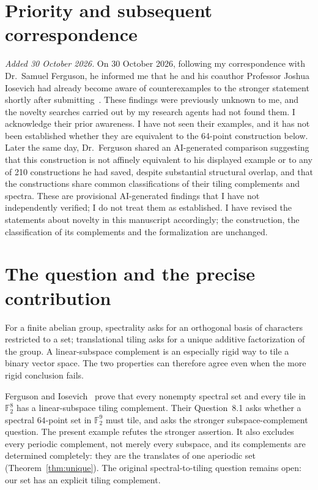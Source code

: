 \documentclass[11pt]{article}
\theoremstyle{definition}\newtheorem{definition}[theorem]{Definition}
\theoremstyle{remark}\newtheorem{remark}[theorem]{Remark}
\newcommand{\F}{\mathbb F}
\begin{document}
\section*{Priority and subsequent correspondence}
\emph{Added 30 October 2026.} On 30 October 2026, following my correspondence with Dr.~Samuel Ferguson, he informed me that he and his coauthor Professor Joshua Iosevich had already become aware of counterexamples to the stronger statement shortly after submitting~\cite{fi8}. These findings were previously unknown to me, and the novelty searches carried out by my research agents had not found them. I acknowledge their prior awareness. I have not seen their examples, and it has not been established whether they are equivalent to the 64-point construction below. Later the same day, Dr.~Ferguson shared an AI-generated comparison suggesting that this construction is not affinely equivalent to his displayed example or to any of 210 constructions he had saved, despite substantial structural overlap, and that the constructions share common classifications of their tiling complements and spectra. These are provisional AI-generated findings that I have not independently verified; I do not treat them as established. I have revised the statements about novelty in this manuscript accordingly; the construction, the classification of its complements and the formalization are unchanged.


\section{The question and the precise contribution}

For a finite abelian group, spectrality asks for an orthogonal basis of characters restricted to a set; translational tiling asks for a unique additive factorization of the group. A linear-subspace complement is an especially rigid way to tile a binary vector space. The two properties can therefore agree even when the more rigid conclusion fails.

Ferguson and Iosevich~\cite{fi8} prove that every nonempty spectral set and every tile in $\F_2^8$ has a linear-subspace tiling complement. Their Question~8.1 asks whether a spectral $64$-point set in $\F_2^9$ must tile, and asks the stronger subspace-complement question. The present example refutes the stronger assertion. It also excludes every periodic complement, not merely every subspace, and its complements are determined completely: they are the translates of one aperiodic set (Theorem~\ref{thm:unique}). The original spectral-to-tiling question remains open: our set has an explicit tiling complement.
\end{document}
